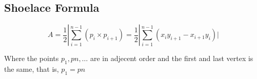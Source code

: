 \subsection{Shoelace Formula}
$$ A = \dfrac{1}{2} | \sum_{i=1}^{n - 1} (p_{i} \times p_{i+1}) = \dfrac{1}{2} | \sum_{i=1}^{n - 1} (x_{i} y_{i+1} - x_{i+1} y_{i}) | $$

Where the points $p_{1}, p{n}, \dots$ are in adjecent order and the first and last vertex is the same, that is, $p_{1} = p{n}$